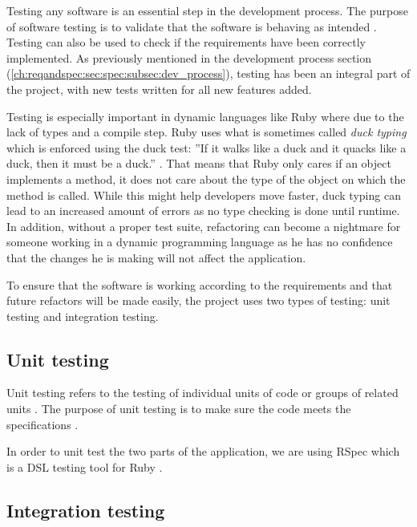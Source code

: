 Testing any software is an essential step in the development process. The purpose of software testing is to validate that the software is behaving as intended \citep{lit:software_testing}. Testing can also be used to check if the requirements have been correctly implemented. As previously mentioned in the development process section (\ref{ch:reqandspec:sec:spec:subsec:dev_process}), testing has been an integral part of the project, with new tests written for all new features added.

Testing is especially important in dynamic languages like Ruby where due to the lack of types and a compile step. Ruby uses what is sometimes called \textit{duck typing} which is enforced using the duck test: ''If it walks like a duck and it quacks like a duck, then it must be a duck.'' \citep{wiki:duck_typing}. That means that Ruby only cares if an object implements a method, it does not care about the type of the object on which the method is called. While this might help developers move faster, duck typing can lead to an increased amount of errors as no type checking is done until runtime. In addition, without a proper test suite, refactoring can become a nightmare for someone working in a dynamic programming language as he has no confidence that the changes he is making will not affect the application.

To ensure that the software is working according to the requirements and that future refactors will be made easily, the project uses two types of testing: unit testing and integration testing.


\subsection{Unit testing}

Unit testing refers to the testing of individual units of code or groups
of related units \citep{unit_testing}. The purpose of unit testing is to
make sure the code meets the specifications \citep{Olan2003}.


In order to unit test the two parts of the application, we are using RSpec which is a DSL testing tool for Ruby \citep{wiki:rspec}.

\subsection{Integration testing}
